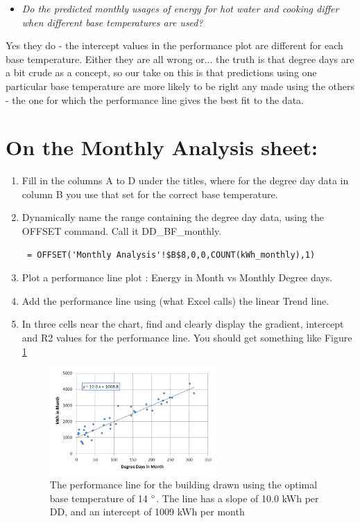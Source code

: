 \documentclass{article}
\begin{document}
\begin{enumerate}
\begin{itemize}
\item \textit{Do the predicted monthly usages of energy for hot water and cooking differ when different base temperatures are used?}
\end{itemize}

Yes they do - the intercept values in the performance plot are different for each base temperature. Either they are all wrong or... the truth is that degree days are a bit crude as a concept, so our take on this is that  predictions using one particular base temperature are more likely to be right any made using the others - the one for which the performance line gives the best fit to the data. 
\end{enumerate}

\section{On the Monthly Analysis sheet:}
\begin{enumerate}
\item Fill in the columns A to D under the titles, where for the degree day data in column B you use that set for the correct base temperature.
\item Dynamically name the range containing the degree day data, using the {\color{blue}OFFSET} command. Call it DD\_BF\_monthly.
{\color{blue}
\begin{verbatim}
 = OFFSET('Monthly Analysis'!$B$8,0,0,COUNT(kWh_monthly),1)
\end{verbatim}
}
\item Plot a performance line plot : Energy in Month vs Monthly Degree days.
\item Add the performance line using (what Excel calls) the linear Trend line.
\item In three cells near the chart, find and clearly display the gradient, intercept and R2 values for the performance line. You should get something like Figure \ref{fig:best_fit_pf}

\begin{figure}
\includegraphics[width=0.6\textwidth]{optimal_performance_line}
\caption{The performance line for the building drawn using the optimal base temperature of 14 $\degree$. The line has a slope of 10.0 kWh per DD, and an intercept of 1009 kWh per month}
\label{fig:best_fit_pf}
\end{figure}
\end{enumerate}
\end{document}
